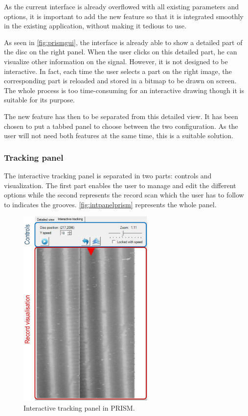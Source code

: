 As the current interface is already overflowed with all existing parameters and options, it is important to add the new feature so that it is integrated smoothly in the existing application, without making it tedious to use.

As seen in \autoref{fig:prismgui}, the interface is already able to show a detailed part of the disc on the right panel. When the user clicks on this detailed part, he can visualize other information on the signal. However, it is not designed to be interactive. In fact, each time the user selects a part on the right image, the corresponding part is reloaded and stored in a bitmap to be drawn on screen. The whole process is too time-consuming for an interactive drawing though it is suitable for its purpose.

The new feature has then to be separated from this detailed view. It has been chosen to put a tabbed panel to choose between the two configuration. As the user will not need both features at the same time, this is a suitable solution.

\subsubsection{Tracking panel}

The interactive tracking panel is separated in two parts: controls and visualization. The first part enables the user to manage and edit the different options while the second represents the record scan which the user has to follow to indicates the grooves. \autoref{fig:intpanelprism} represents the whole panel.

\begin{figure}[!ht]
\centering
\includegraphics[width=0.6\textwidth]{images/int-track-panel-prism}
\caption{Interactive tracking panel in PRISM.}
\label{fig:intpanelprism}
\end{figure}

